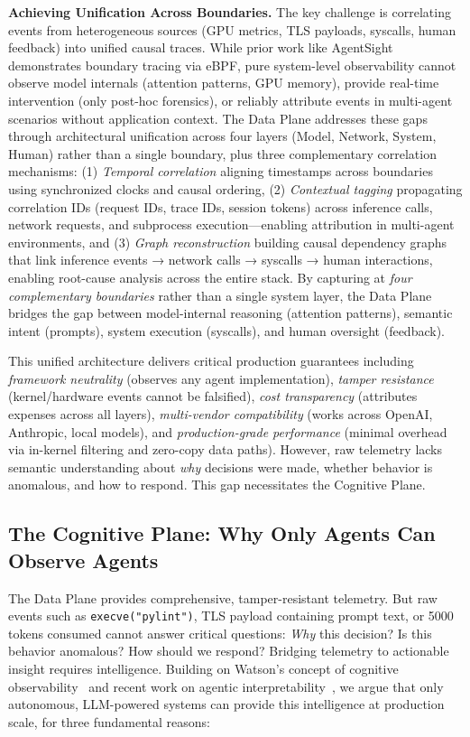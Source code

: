 \documentclass[sigplan,screen,9pt]{acmart}
\begin{document}
\textbf{Achieving Unification Across Boundaries.} The key challenge is correlating events from heterogeneous sources (GPU metrics, TLS payloads, syscalls, human feedback) into unified causal traces. While prior work like AgentSight~\cite{zheng2025agentsight} demonstrates boundary tracing via eBPF, pure system-level observability cannot observe model internals (attention patterns, GPU memory), provide real-time intervention (only post-hoc forensics), or reliably attribute events in multi-agent scenarios without application context. The Data Plane addresses these gaps through architectural unification across four layers (Model, Network, System, Human) rather than a single boundary, plus three complementary correlation mechanisms: (1) \emph{Temporal correlation} aligning timestamps across boundaries using synchronized clocks and causal ordering, (2) \emph{Contextual tagging} propagating correlation IDs (request IDs, trace IDs, session tokens) across inference calls, network requests, and subprocess execution—enabling attribution in multi-agent environments, and (3) \emph{Graph reconstruction} building causal dependency graphs that link inference events → network calls → syscalls → human interactions, enabling root-cause analysis across the entire stack. By capturing at \emph{four complementary boundaries} rather than a single system layer, the Data Plane bridges the gap between model-internal reasoning (attention patterns), semantic intent (prompts), system execution (syscalls), and human oversight (feedback).

This unified architecture delivers critical production guarantees including \emph{framework neutrality} (observes any agent implementation), \emph{tamper resistance} (kernel/hardware events cannot be falsified), \emph{cost transparency} (attributes expenses across all layers), \emph{multi-vendor compatibility} (works across OpenAI, Anthropic, local models), and \emph{production-grade performance} (minimal overhead via in-kernel filtering and zero-copy data paths). However, raw telemetry lacks semantic understanding about \emph{why} decisions were made, whether behavior is anomalous, and how to respond. This gap necessitates the Cognitive Plane.

\subsection{The Cognitive Plane: Why Only Agents Can Observe Agents}

The Data Plane provides comprehensive, tamper-resistant telemetry. But raw events such as \texttt{execve("pylint")}, TLS payload containing prompt text, or 5000 tokens consumed cannot answer critical questions: \emph{Why} this decision? Is this behavior anomalous? How should we respond? Bridging telemetry to actionable insight requires intelligence. Building on Watson's concept of cognitive observability~\cite{Rombaut2025Watson} and recent work on agentic interpretability~\cite{Kim2025AgenticInterp}, we argue that only autonomous, LLM-powered systems can provide this intelligence at production scale, for three fundamental reasons:
\end{document}
